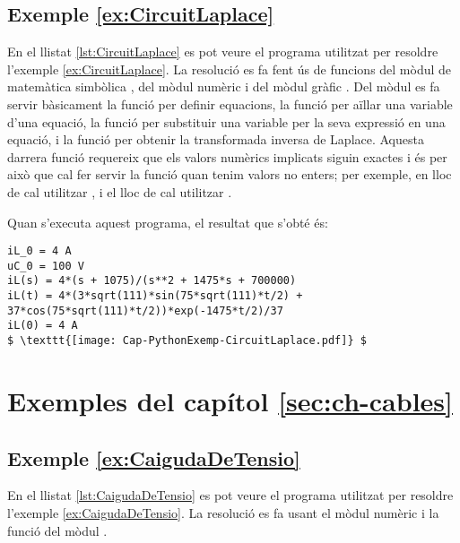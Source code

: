\hypertarget{exemple:CircuitLaplace}{\subsection{Exemple \ref*{ex:CircuitLaplace} \CircuitLaplace}}
En el llistat \vref{lst:CircuitLaplace} es pot veure el programa utilitzat per resoldre l'exemple \vref{ex:CircuitLaplace}. La resolució es fa fent ús de funcions del mòdul de matemàtica simbòlica , del mòdul numèric  i del mòdul gràfic  . Del mòdul  es fa servir bàsicament la funció  per definir equacions,  la funció  per aïllar una variable d'una equació, la funció  per substituir  una variable per la seva expressió en una equació, i la   funció  per obtenir la transformada inversa de Laplace. Aquesta  darrera funció requereix que els valors numèrics implicats siguin exactes i és per això que cal fer servir la funció  quan tenim valors no enters; per exemple, en lloc de  cal utilitzar , i el lloc de  cal utilitzar .


Quan s'executa aquest programa, el resultat que s'obté és:
\lstset{
	language=,
	numbers=none,
	frame=none
}
\begin{lstlisting}[mathescape=true]
iL_0 = 4 A
uC_0 = 100 V
iL(s) = 4*(s + 1075)/(s**2 + 1475*s + 700000)
iL(t) = 4*(3*sqrt(111)*sin(75*sqrt(111)*t/2) + 37*cos(75*sqrt(111)*t/2))*exp(-1475*t/2)/37
iL(0) = 4 A
$ \texttt{[image: Cap-PythonExemp-CircuitLaplace.pdf]} $
\end{lstlisting} 





\section{Exemples del capítol \ref*{sec:ch-cables}}

\hypertarget{exemple:CaigudaDeTensio}{\subsection{Exemple \ref*{ex:CaigudaDeTensio} \CaigudaDeTensio}}
En el llistat \vref{lst:CaigudaDeTensio} es pot veure el programa utilitzat per resoldre l'exemple \vref{ex:CaigudaDeTensio}. La resolució es fa usant el mòdul numèric  i  la funció  del mòdul .


